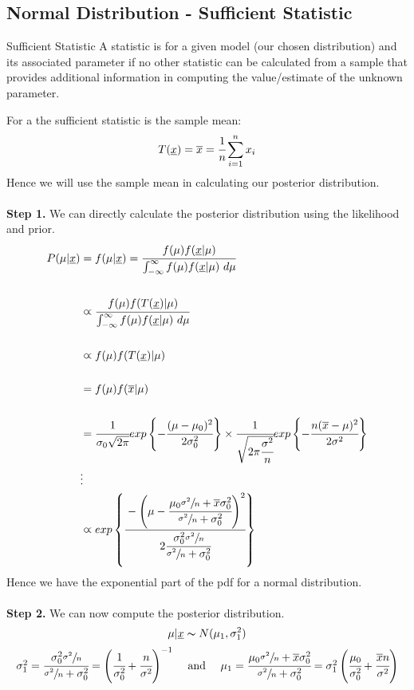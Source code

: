 \subsection{Normal Distribution - Sufficient Statistic}
\begin{definitionbox}{Sufficient Statistic}
	A statistic is  for a given model (our chosen distribution) and its associated parameter if no other statistic can be calculated from a sample that provides additional information in computing the value/estimate of the unknown parameter.
\end{definitionbox}

For a  the sufficient statistic is the sample mean:
\[T(\underline{x}) = \overline{x} = \cfrac{1}{n}\sum_{i=1}^n x_i\]
Hence we will use the sample mean in calculating our posterior distribution.
\\
\\ \textbf{Step 1.} We can directly calculate the posterior distribution using the likelihood and prior.
\[\begin{split}
		P(\mu|\underline{x}) &= f(\mu|\underline{x}) = \cfrac{f(\mu)f(\underline{x}|\mu)}{\int_{-\infty}^\infty f(\mu)f(\underline{x}|\mu) \ d \mu} \\
		\\
		&\varpropto  \cfrac{f(\mu)f(T(\underline{x})|\mu)}{\int_{-\infty}^\infty f(\mu)f(\underline{x}|\mu) \ d \mu} \\
		\\
		&\varpropto f(\mu)f(T(\underline{x})| \mu) \\
		\\
		&= f(\mu)f(\overline{x}| \mu) \\
		\\
		&= \cfrac{1}{\sigma_0 \sqrt{2 \pi}} exp \left\{ -\cfrac{(\mu - \mu_0)^2}{2 \sigma^2_0} \right\} \times \cfrac{1}{\sqrt{2 \pi \cfrac{\sigma^2}{n}}} exp \left\{ -\cfrac{n(\overline{x} - \mu)^2}{2 \sigma^2} \right\} \\
		& \vdots \\
		&\varpropto exp \left\{ \cfrac{-\left( \mu - \cfrac{\mu_0\sfrac{\sigma^2}{n} + \overline{x}\sigma^2_0}{\sfrac{\sigma^2}{n} + \sigma^2_0} \right)^2}{2 \cfrac{\sigma^2_0\sfrac{\sigma^2}{n}}{\sfrac{\sigma^2}{n} + \sigma_0^2}} \right\}
	\end{split}\]
Hence we have the exponential part of the pdf for a normal distribution.
\\
\\ \textbf{Step 2.} We can now compute the posterior distribution.
\[\mu|\underline{x} \thicksim N(\mu_1, \sigma_1^2)\]
\[\begin{matrix}
		\sigma_1^2 = \cfrac{\sigma_0^2\sfrac{\sigma^2}{n}}{\sfrac{\sigma^2}{n} + \sigma_0^2} = \left( \cfrac{1}{\sigma^2_0} + \cfrac{n}{\sigma^2} \right)^{-1} & \text{  and  } & \mu_1 = \cfrac{\mu_0 \sfrac{\sigma^2}{n} + \overline{x}\sigma_0^2}{\sfrac{\sigma^2}{n} + \sigma^2_0} = \sigma_1^2 \left( \cfrac{\mu_0}{\sigma_0^2} + \cfrac{\overline{x}n}{\sigma^2} \right)
	\end{matrix}\]
